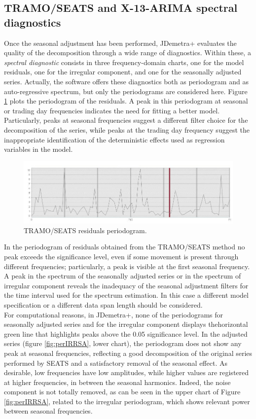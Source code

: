 \documentclass[english,blauw]{cbsdiscussionpaper}
\begin{document}
\subsection{TRAMO/SEATS and X-13-ARIMA spectral diagnostics}
Once the seasonal adjustment has been performed, JDemetra+ evaluates the quality of the decomposition through a wide range of diagnostics. Within these, a \textit{spectral diagnostic} consists in three frequency-domain charts, one for the model residuals, one for the irregular component, and one for the seasonally adjusted series. Actually, the software offers these diagnostics both as periodogram and as auto-regressive spectrum, but only the periodograms are considered here. Figure \ref{fig:perRES} plots the periodogram of the residuals. A peak in this periodogram at  seasonal or trading day frequencies indicates the need for fitting a better model. Particularly, peaks at seasonal frequencies suggest a different filter choice for the decomposition of the series, while peaks at the trading day frequency suggest the inappropriate identification of the deterministic effects used as regression variables in the model.
\begin{figure}[h]
\includegraphics[width=\linewidth]{../images/capitolo3/perRES.jpg}
\caption{TRAMO/SEATS residuals periodogram.}
\label{fig:perRES}
\end{figure}
In the periodogram of residuals obtained from the TRAMO/SEATS method no peak exceeds the significance level, even if some movement is present through different frequencies; particularly, a peak is visible at the first seasonal frequency. A peak in the spectrum of the seasonally adjusted series or in the spectrum of irregular component reveals the inadequacy of the seasonal adjustment filters for the time interval used for the spectrum estimation. In this case a different model specification or a different data span length should be considered.\\For computational reasons, in JDemetra+, none of the periodograms for seasonally adjusted series and for the irregular component displays thehorizontal green line that highlights peaks above the 0.05 significance level. In the adjusted series (figure \ref{fig:perIRRSA}, lower chart), the periodogram does not show any peak at seasonal frequencies, reflecting a good decomposition of the original series performed by SEATS and a satisfactory removal of the seasonal effect. As desirable, low frequencies have low amplitudes, while higher values are registered at higher frequencies, in between the seasonal harmonics. Indeed, the noise component is not totally removed, as can be seen in the upper chart of Figure \ref{fig:perIRRSA}, related to the irregular periodogram, which shows relevant power between seasonal frequencies.
\end{document}
